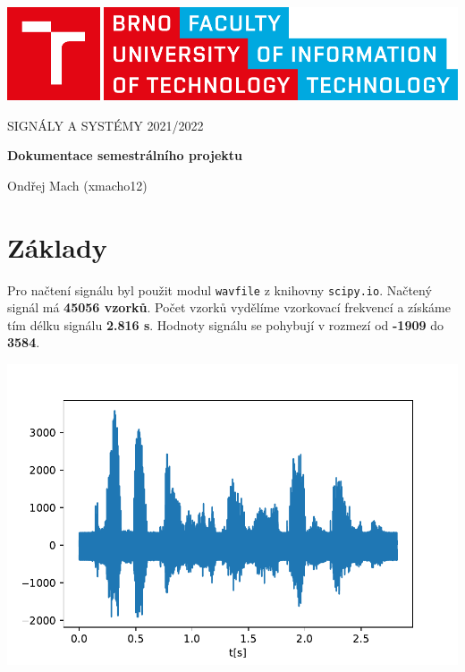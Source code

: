 \documentclass[12pt,a4paper]{article}
\begin{document}
	\begin{titlepage}
		\begin{center}
			\includegraphics[width=0.5\linewidth]{img/logo.pdf}
			\vspace{3cm}
			
			\LARGE\uppercase{Signály a systémy 2021/2022}
			\vspace{1cm}
			
			\LARGE\textbf{Dokumentace semestrálního projektu}
			
			\vspace*{\fill}
			\large{Ondřej Mach (xmacho12)}
		\end{center}
	\end{titlepage}
	
	
	\setcounter{page}{1}
	\tableofcontents
	\clearpage
	
	

	\section{Základy}
		Pro načtení signálu byl použit modul \texttt{wavfile} z knihovny \texttt{scipy.io}.
		Načtený signál má \textbf{45056 vzorků}.
		Počet vzorků vydělíme vzorkovací frekvencí a získáme tím délku signálu \textbf{2.816 s}.
		Hodnoty signálu se pohybují v rozmezí od \textbf{-1909} do \textbf{3584}.
		
		\includegraphics{img/basic.pdf}
		
\end{document}
